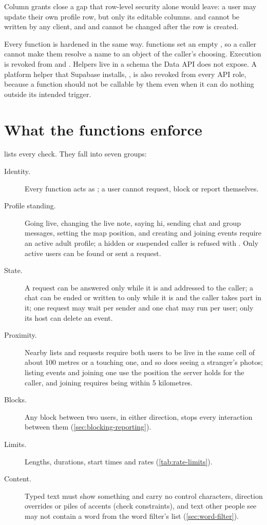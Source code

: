 Column grants close a gap that row-level security alone would leave: a user may update their own profile
row, but only its editable columns.  and  cannot be written by any client, and
 and  cannot be changed after the row is created.

Every function is hardened in the same way.  functions set an empty
, so a caller cannot make them resolve a name to an object of the caller's choosing.
Execution is revoked from  and . Helpers live in a schema the Data API does not
expose. A platform helper that Supabase installs, , is also revoked from
every API role, because a  function should not be callable by them even when it
can do nothing outside its intended trigger.

\section{What the functions enforce}

 lists every check. They fall into seven groups:

\begin{description}
  \item[Identity.] Every function acts as ; a user cannot request, block or report
    themselves.
  \item[Profile standing.] Going live, changing the live note, saying hi, sending chat and group messages,
    setting the map position, and creating and joining events require an active adult profile; a hidden
    or suspended caller is refused with . Only active users can be found or sent a
    request.
  \item[State.] A request can be answered only while it is  and addressed to the caller; a
    chat can be ended or written to only while it is  and the caller takes part in it;
    one request may wait per sender and one chat may run per user; only its host can delete an event.
  \item[Proximity.] Nearby lists and requests require both users to be live in the same cell of about
    100 metres or a touching one, and so does seeing a stranger's photos; listing events and joining one
    use the position the server holds for the caller, and joining requires being within 5 kilometres.
  \item[Blocks.] Any block between two users, in either direction, stops every interaction between
    them (\cref{sec:blocking-reporting}).
  \item[Limits.] Lengths, durations, start times and rates (\cref{tab:rate-limits}).
  \item[Content.] Typed text must show something and carry no control characters, direction overrides or
    piles of accents (check constraints), and text other people see may not contain a word from the word
    filter's list (\cref{sec:word-filter}).
\end{description}

